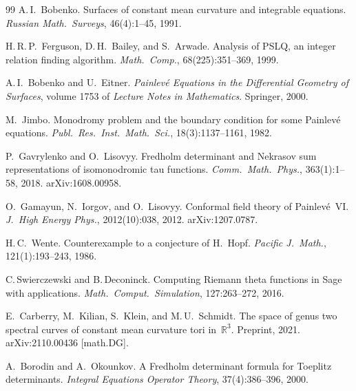 \documentclass[11pt,a4paper]{article}
\theoremstyle{plain}
\theoremstyle{definition}
\theoremstyle{remark}
\begin{document}
\begin{thebibliography}{99}
A.\,I.~Bobenko.
\newblock Surfaces of constant mean curvature and integrable equations.
\newblock \emph{Russian Math.\ Surveys}, 46(4):1--45, 1991.

H.\,R.\,P.~Ferguson, D.\,H.~Bailey, and S.~Arwade.
\newblock Analysis of PSLQ, an integer relation finding algorithm.
\newblock \emph{Math.\ Comp.}, 68(225):351--369, 1999.

A.\,I.~Bobenko and U.~Eitner.
\newblock \emph{Painlev\'e Equations in the Differential Geometry of
  Surfaces}, volume 1753 of \emph{Lecture Notes in Mathematics}.
\newblock Springer, 2000.

M.~Jimbo.
\newblock Monodromy problem and the boundary condition for some
  Painlev\'e equations.
\newblock \emph{Publ.\ Res.\ Inst.\ Math.\ Sci.}, 18(3):1137--1161, 1982.

P.~Gavrylenko and O.~Lisovyy.
\newblock Fredholm determinant and Nekrasov sum representations of
  isomonodromic tau functions.
\newblock \emph{Comm.\ Math.\ Phys.}, 363(1):1--58, 2018.
\newblock arXiv:1608.00958.

O.~Gamayun, N.~Iorgov, and O.~Lisovyy.
\newblock Conformal field theory of Painlev\'e~VI.
\newblock \emph{J.\ High Energy Phys.}, 2012(10):038, 2012.
\newblock arXiv:1207.0787.

H.\,C.~Wente.
\newblock Counterexample to a conjecture of H.~Hopf.
\newblock \emph{Pacific J.\ Math.}, 121(1):193--243, 1986.

C.\,Swierczewski and B.\,Deconinck.
\newblock Computing Riemann theta functions in Sage with applications.
\newblock \emph{Math.\ Comput.\ Simulation}, 127:263--272, 2016.

E.~Carberry, M.~Kilian, S.~Klein, and M.\,U.~Schmidt.
\newblock The space of genus two spectral curves of constant mean curvature
  tori in~$\mathbb{R}^3$.
\newblock Preprint, 2021.
\newblock arXiv:2110.00436 [math.DG].

A.~Borodin and A.~Okounkov.
\newblock A Fredholm determinant formula for Toeplitz determinants.
\newblock \emph{Integral Equations Operator Theory}, 37(4):386--396, 2000.

\end{thebibliography}
\end{document}
